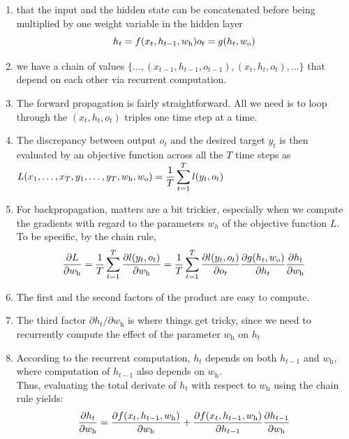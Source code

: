 \begin{enumerate}[itemsep=0.2cm]
    \item that the input and the hidden state can be concatenated before being multiplied by one weight variable in the hidden layer
    \[
        \hfill
        h_t = f(x_t, h_{t-1}, w_\textrm{h})
        \hfill
        o_t = g(h_t, w_\textrm{o})
        \hfill
    \]

    \item we have a chain of values $\{\ldots, (x_{t-1}, h_{t-1}, o_{t-1}), (x_{t}, h_{t}, o_t), \ldots\}$ that depend on each other via recurrent computation. 

    \item The forward propagation is fairly straightforward. All we need is to loop through the $(x_t, h_t, o_t)$ triples one time step at a time.

    \item The discrepancy between output $o_t$ and the desired target $y_t$ is then evaluated by an objective function across all the $T$ time steps as
    $
        \hfill
        L(x_1, \ldots, x_T, y_1, \ldots, y_T, w_\textrm{h}, w_\textrm{o}) = \dfrac{1}{T}\dsum_{t=1}^T l(y_t, o_t)
        \hfill
    $

    \item For backpropagation, matters are a bit trickier, especially when we compute the gradients with regard to the parameters $w_h$ of the objective function $L$. To be specific, by the chain rule,
    \[
        \dfrac{\partial L}{\partial w_\textrm{h}}  
        = \dfrac{1}{T}\displaystyle\sum_{t=1}^T \dfrac{\partial l(y_t, o_t)}{\partial w_\textrm{h}}  \\
        = \dfrac{1}{T}\displaystyle\sum_{t=1}^T \dfrac{\partial l(y_t, o_t)}{\partial o_t} \dfrac{\partial g(h_t, w_\textrm{o})}{\partial h_t}  \dfrac{\partial h_t}{\partial w_\textrm{h}}
    \]

    \item The first and the second factors of the product are easy to compute.
    \item The third factor $\partial h_t/\partial w_\textrm{h}$ is where things get tricky, since we need to recurrently compute the effect of the parameter $w_\textrm{h}$ on $h_t$
    \item According to the recurrent computation, $h_t$ depends on both $h_{t-1}$ and $w_\textrm{h}$, where computation of $h_{t-1}$ also depends on $w_\textrm{h}$.\\
    Thus, evaluating the total derivate of $h_t$ with respect to $w_\textrm{h}$ using the chain rule yields:
    \[
        \hfill
        \dfrac{\partial h_t}{\partial w_\textrm{h}}= \dfrac{\partial f(x_{t},h_{t-1},w_\textrm{h})}{\partial w_\textrm{h}} +\dfrac{\partial f(x_{t},h_{t-1},w_\textrm{h})}{\partial h_{t-1}} \dfrac{\partial h_{t-1}}{\partial w_\textrm{h}}
        \hfill
    \]


\end{enumerate}

